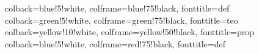 \usepackage[most]{tcolorbox}
\usepackage{amsmath, amsthm, amssymb}
\usepackage[margin=2.5cm]{geometry}


%
{colback=blue!5!white, colframe=blue!75!black, fonttitle=\bfseries}{def}
%
{colback=green!5!white, colframe=green!75!black, fonttitle=\bfseries}{teo}
%
{colback=yellow!10!white, colframe=yellow!50!black, fonttitle=\bfseries}{prop}
%
{colback=blue!5!white, colframe=red!75!black, fonttitle=\bfseries}{def}

\newcommand{\N}{\mathbb{N}}
\newcommand{\Z}{\mathbb{Z}}
\newcommand{\Q}{\mathbb{Q}}
\newcommand{\R}{\mathbb{R}}
\newcommand{\C}{\mathbb{C}}
